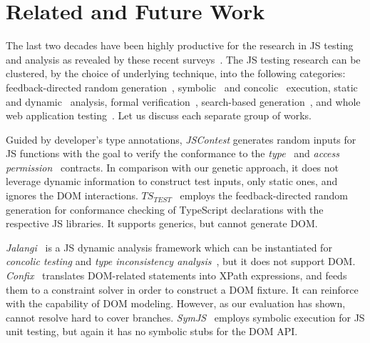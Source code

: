 \section{Related and Future Work}
\label{sec:related.work}

The last two decades have been highly productive for the research in JS testing and analysis as revealed by these recent surveys~\cite{andreasen2017survey, sun2017analysis, mesbah2015advances}.
The JS testing research can be clustered, by the choice of underlying technique, into the following categories: feedback-directed random generation~\cite{heidegger2010contract,heidegger2012jscontest,kristensen2017type}, symbolic~\cite{tanida2014automatic,saxena2010symbolic} and concolic~\cite{sen2013jalangi,amin:ase15} execution, static~\cite{tajs2009,dom2011} and dynamic~\cite{andreasen2017survey} analysis, formal verification~\cite{gardner2008local,lerner2012modeling,gardner2012towards}, search-based generation~\cite{alshraideh2008complete}, and whole web application testing~\cite{alshahwan2011automated,mesbah2012invariant,milani2014leveraging}. Let us discuss each separate group of works.

Guided by developer's type annotations, \emph{JSContest} generates random inputs for JS functions with the goal to verify the conformance to the \emph{type}~\cite{heidegger2010contract} and \emph{access permission}~\cite{heidegger2012jscontest} contracts. In comparison with our genetic approach, it does not leverage dynamic information to construct test inputs, only static ones, and ignores the DOM interactions. $TS_{TEST}$~\cite{kristensen2017type} employs the feedback-directed random generation for conformance checking of TypeScript declarations with the respective JS libraries. It supports generics, but cannot generate DOM.


\emph{Jalangi}~\cite{sen2013jalangi} is a JS dynamic analysis framework which can be instantiated for \emph{concolic testing} and \emph{type inconsistency analysis}~\cite{pradel2015typedevil}, but it does not support DOM. \emph{Confix}~\cite{amin:ase15} translates DOM-related statements into XPath expressions, and feeds them to a constraint solver in order to construct a DOM fixture. It can reinforce \Jalangi with the capability of DOM modeling. However, as our evaluation has shown, \Confix cannot resolve hard to cover branches. \emph{SymJS}~\cite{tanida2014automatic} employs symbolic execution for JS unit testing, but again it has no symbolic stubs for the DOM API.

